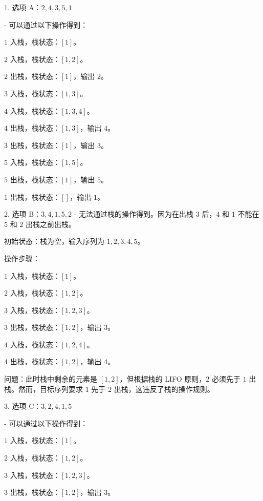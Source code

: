 \documentclass[lang=cn,newtx,10pt,scheme=chinese]{../../../elegantbook}
\begin{document}
\begin{enumerate}
    1. 选项 A：$2, 4, 3, 5, 1$  

       - 可以通过以下操作得到：
    
            $1$ 入栈，栈状态：$[1]$。

            $2$ 入栈，栈状态：$[1, 2]$。

            $2$ 出栈，栈状态：$[1]$，输出 $2$。

            $3$ 入栈，栈状态：$[1, 3]$。

            $4$ 入栈，栈状态：$[1, 3, 4]$。

            $4$ 出栈，栈状态：$[1, 3]$，输出 $4$。

            $3$ 出栈，栈状态：$[1]$，输出 $3$。

            $5$ 入栈，栈状态：$[1, 5]$。

            $5$ 出栈，栈状态：$[1]$，输出 $5$。

            $1$ 出栈，栈状态：$[]$，输出 $1$。

    2. 选项 B：$3, 4,1,5,2$
         - 无法通过栈的操作得到。因为在出栈 $3$ 后，$4$ 和 $1$ 不能在 $5$ 和 $2$ 出栈之前出栈。
    
         初始状态：栈为空，输入序列为 $1, 2, 3, 4, 5$。
    
          操作步骤：
    
          $1$ 入栈，栈状态：$[1]$。
    
          $2$ 入栈，栈状态：$[1, 2]$。
    
          $3$ 入栈，栈状态：$[1, 2, 3]$。
    
          $3$ 出栈，栈状态：$[1, 2]$，输出 $3$。
    
          $4$ 入栈，栈状态：$[1, 2, 4]$。
    
          $4$ 出栈，栈状态：$[1, 2]$，输出 $4$。
    
          问题：此时栈中剩余的元素是 $[1, 2]$，但根据栈的 LIFO 原则，$2$ 必须先于 $1$ 出栈。然而，目标序列要求 $1$ 先于 $2$ 出栈，这违反了栈的操作规则。

    3. 选项 C：$3, 2, 4, 1, 5$

            - 可以通过以下操作得到：
        
                $1$ 入栈，栈状态：$[1]$。
        
                $2$ 入栈，栈状态：$[1, 2]$。
        
                $3$ 入栈，栈状态：$[1, 2, 3]$。
        
                $3$ 出栈，栈状态：$[1, 2]$，输出 $3$。
        

\end{enumerate}
\end{document}
